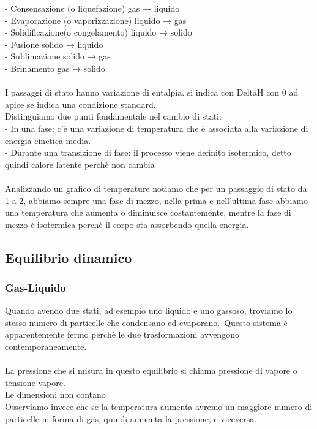 \tab- Consensazione (o liquefazione) gas → liquido\\
\tab- Evaporazione (o vaporizzazione) liquido → gas\\
\tab- Solidificazione(o congelamento) liquido → solido\\
\tab- Fusione solido → liquido\\
\tab- Sublimazione solido → gas\\
\tab- Brinamento gas → solido\\\\
I passaggi di stato hanno variazione di entalpia. si indica con DeltaH con 0 ad apice se indica una condizione standard. \\
Distinguiamo due punti fondamentale nel cambio di stati:\\
\tab- In una fase: c’è una variazione di temperatura che è associata alla variazione di energia cinetica media.\\
\tab- Durante una transizione di fase: il processo viene definito isotermico, detto quindi calore latente perchè non cambia\\\\
Analizzando un grafico di temperature notiamo che per un passaggio di stato da 1 a 2, abbiamo sempre una fase di mezzo, nella prima e nell’ultima fase abbiamo una temperatura che aumenta o diminuisce costantemente, mentre la fase di mezzo è isotermica perchè il corpo sta assorbendo quella energia.
\subsection{Equilibrio dinamico}
\subsubsection{Gas-Liquido}
Quando avendo due stati, ad esempio uno liquido e uno gassoso, troviamo lo stesso numero di particelle che condensano ed evaporano.\
Questo sistema è apparentemente fermo perchè le due trasformazioni avvengono contemporaneamente.\\\\
La pressione che si misura in questo equilibrio si chiama pressione di vapore o tensione vapore.\\
Le dimensioni non contano\\
Osserviamo invece che se la temperatura aumenta avremo un maggiore numero di particelle in forma di gas, quindi aumenta la pressione, e viceversa.\\
